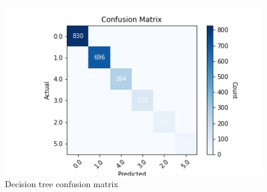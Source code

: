 \begin{figure}[H]
    \includegraphics[scale=0.85]{img/Model/Classification/Dtree/confusion_matrix.png}
    \centering
    \caption{Decision tree confusion matrix}
    \label{fig:dtree_confusion_matrix}
\end{figure}